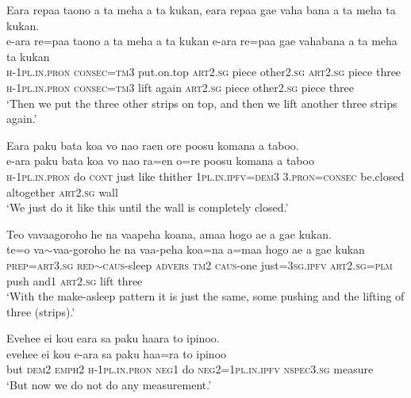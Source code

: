 \ea\label{ex:text14-33}
Eara repaa taono a ta meha a ta kukan, eara repaa gae vaha bana a ta meha ta kukan.\\
\gll e-ara	re=paa	taono	a	ta	meha	a	ta	kukan	e-ara	re=paa	gae	vahabana	a	ta	meha	ta	kukan\\
     \textsc{h}-1\textsc{pl}.\textsc{in}.\textsc{pron}	\textsc{consec}=\textsc{tm}3	put.on.top	\textsc{art}2.\textsc{sg}	piece	other2.\textsc{sg}	\textsc{art}2.\textsc{sg}	piece	three	\textsc{h}-1\textsc{pl}.\textsc{in}.\textsc{pron}	\textsc{consec}=\textsc{tm}3	lift	again	\textsc{art}2.\textsc{sg}	piece	other2.\textsc{sg}	piece	three\\
\glt `Then we put the three other strips on top, and then we lift another three strips again.'
\z

\ea\label{ex:text14-34}
Eara paku bata koa vo nao raen ore poosu komana a taboo.\\
\gll e-ara	paku	bata	koa	vo	nao	ra=en	o=re	poosu	komana	a	taboo\\
     \textsc{h}-1\textsc{pl}.\textsc{in}.\textsc{pron}	do	\textsc{cont}	just	like	thither	1\textsc{pl}.\textsc{in}.\textsc{ipfv}=\textsc{dem}3	3.\textsc{pron}=\textsc{consec}	be.closed	altogether	\textsc{art}2.\textsc{sg}	wall\\
\glt `We just do it like this until the wall is completely closed.'
\z

\ea\label{ex:text14-35}
Teo vavaagoroho he na vaapeha koana, amaa hogo ae a gae kukan.\\
\gll te=o	va{$\sim$}vaa-goroho	he	na	vaa-peha	koa=na	a=maa	hogo	ae	a	gae	kukan\\
     \textsc{prep}=\textsc{art}3.\textsc{sg}	\textsc{red}{$\sim$}\textsc{caus}-sleep	\textsc{advers}	\textsc{tm}2	\textsc{caus}-one	just=3\textsc{sg}.\textsc{ipfv}	\textsc{art}2.\textsc{sg}=\textsc{plm}	push	and1	\textsc{art}2.\textsc{sg}	lift	three\\
\glt `With the make-asleep pattern it is just the same, some pushing and the lifting of three (strips).'
\z

\ea\label{ex:text14-36}
Evehee ei kou eara sa paku haara to ipinoo.\\
\gll evehee	ei	kou	e-ara	sa	paku	haa=ra	to	ipinoo\\
     but	\textsc{dem}2	\textsc{emph}2	\textsc{h}-1\textsc{pl}.\textsc{in}.\textsc{pron}	\textsc{neg}1	do	\textsc{neg}2=1\textsc{pl}.\textsc{in}.\textsc{ipfv}	\textsc{nspec}3.\textsc{sg}	measure\\
\glt `But now we do not do any measurement.'
\z

